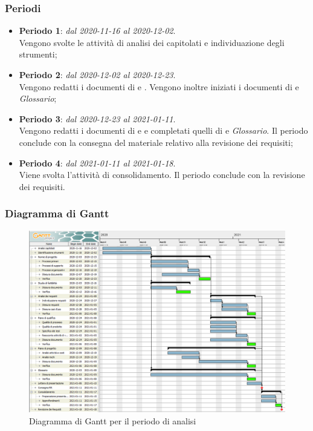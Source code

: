 \subsubsection{Periodi}

\begin{itemize}
\item \textbf{Periodo 1}: \textit{dal 2020-11-16 al 2020-12-02}. \\
Vengono svolte le attività di analisi dei capitolati e individuazione degli strumenti;
\item \textbf{Periodo 2}: \textit{dal 2020-12-02 al 2020-12-23}. \\
Vengono redatti i documenti di \NdP{} e \SdF{}. Vengono inoltre iniziati i documenti di \PdP{} e \textit{Glossario};
\item \textbf{Periodo 3}: \textit{dal 2020-12-23 al 2021-01-11}. \\
Vengono redatti i documenti di \PdQ{} e \AdR{} e completati quelli di \PdP{} e \textit{Glossario}. Il periodo conclude con la consegna del materiale relativo alla revisione dei requisiti;
\item \textbf{Periodo 4}: \textit{dal 2021-01-11 al 2021-01-18}. \\
Viene svolta l'attività di consolidamento. Il periodo conclude con la revisione dei requisiti.
\end{itemize}

\subsubsection{Diagramma di Gantt}

\begin{figure}[H]
\centering

\centerline{\includegraphics[scale=0.6]{res/Pianificazione/Gantt/analisi}}
\caption{Diagramma di Gantt per il periodo di analisi}
\end{figure}